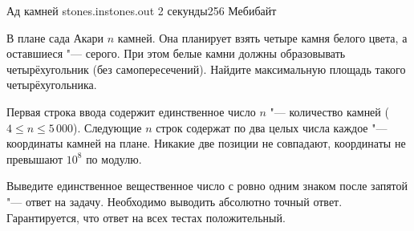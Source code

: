 
\begin{problem}{Ад камней}
{stones.in}{stones.out}
{2 секунды}{256 Мебибайт}

В плане сада Акари $n$ камней. Она планирует взять четыре
камня белого цвета, а оставшиеся "--- серого. При этом
белые камни должны образовывать четырёхугольник (без
самопересечений). Найдите максимальную площадь такого
четырёхугольника.

\InputFile

Первая строка ввода содержит единственное число $n$ "---
количество камней ($4 \leqslant n \leqslant 5\,000$).
Следующие $n$ строк содержат по два целых числа каждое "---
координаты камней на плане. Никакие две позиции не совпадают,
координаты не превышают $10^8$ по модулю.

\OutputFile

Выведите единственное вещественное число с ровно
одним знаком после запятой "--- ответ на задачу.
Необходимо выводить абсолютно точный ответ.
Гарантируется, что ответ на всех тестах положительный.

\Example

\begin{example}
%
\end{example}

\end{problem}
